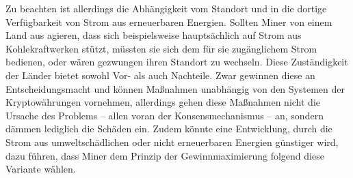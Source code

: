Zu beachten ist allerdings die Abhängigkeit vom Standort und in die dortige Verfügbarkeit von Strom aus erneuerbaren Energien. Sollten Miner von einem Land aus agieren, dass sich beispielsweise hauptsächlich auf Strom aus Kohlekraftwerken stützt, müssten sie sich dem für sie zugänglichem Strom bedienen, oder wären gezwungen ihren Standort zu wechseln. Diese Zuständigkeit der Länder bietet sowohl Vor- als auch Nachteile. Zwar gewinnen diese an Entscheidungsmacht und können Maßnahmen unabhängig von den Systemen der Kryptowährungen vornehmen, allerdings gehen diese Maßnahmen nicht die Ursache des Problems – allen voran der Konsensmechanismus – an, sondern dämmen lediglich die Schäden ein. Zudem könnte eine Entwicklung, durch die Strom aus umweltschädlichen oder nicht erneuerbaren Energien günstiger wird, dazu führen, dass Miner dem Prinzip der Gewinnmaximierung folgend diese Variante wählen.
